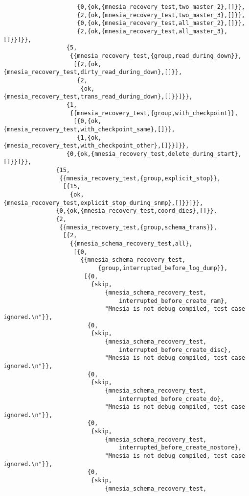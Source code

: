\begin{verbatim}
                     {0,{ok,{mnesia_recovery_test,two_master_2},[]}},
                     {2,{ok,{mnesia_recovery_test,two_master_3},[]}},
                     {0,{ok,{mnesia_recovery_test,all_master_2},[]}},
                     {2,{ok,{mnesia_recovery_test,all_master_3},[]}}]}},
                  {5,
                   {{mnesia_recovery_test,{group,read_during_down}},
                    [{2,{ok,{mnesia_recovery_test,dirty_read_during_down},[]}},
                     {2,
                      {ok,{mnesia_recovery_test,trans_read_during_down},[]}}]}},
                  {1,
                   {{mnesia_recovery_test,{group,with_checkpoint}},
                    [{0,{ok,{mnesia_recovery_test,with_checkpoint_same},[]}},
                     {1,{ok,{mnesia_recovery_test,with_checkpoint_other},[]}}]}},
                  {0,{ok,{mnesia_recovery_test,delete_during_start},[]}}]}},
               {15,
                {{mnesia_recovery_test,{group,explicit_stop}},
                 [{15,
                   {ok,{mnesia_recovery_test,explicit_stop_during_snmp},[]}}]}},
               {0,{ok,{mnesia_recovery_test,coord_dies},[]}},
               {2,
                {{mnesia_recovery_test,{group,schema_trans}},
                 [{2,
                   {{mnesia_schema_recovery_test,all},
                    [{0,
                      {{mnesia_schema_recovery_test,
                           {group,interrupted_before_log_dump}},
                       [{0,
                         {skip,
                             {mnesia_schema_recovery_test,
                                 interrupted_before_create_ram},
                             "Mnesia is not debug compiled, test case ignored.\n"}},
                        {0,
                         {skip,
                             {mnesia_schema_recovery_test,
                                 interrupted_before_create_disc},
                             "Mnesia is not debug compiled, test case ignored.\n"}},
                        {0,
                         {skip,
                             {mnesia_schema_recovery_test,
                                 interrupted_before_create_do},
                             "Mnesia is not debug compiled, test case ignored.\n"}},
                        {0,
                         {skip,
                             {mnesia_schema_recovery_test,
                                 interrupted_before_create_nostore},
                             "Mnesia is not debug compiled, test case ignored.\n"}},
                        {0,
                         {skip,
                             {mnesia_schema_recovery_test,

\end{verbatim}
